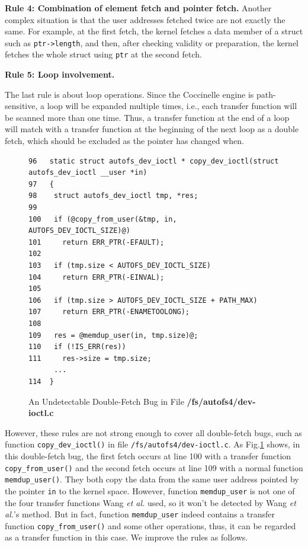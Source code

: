 \documentclass[10pt]{llncs}
\begin{document}
\textbf{Rule 4: Combination of element fetch and pointer fetch.}
Another complex situation is that the user addresses fetched twice are not exactly the same. For example, at the first fetch, the kernel fetches a data member of a struct such as \verb:ptr->length:, and then, after checking validity or preparation, the kernel fetches the whole struct using \verb:ptr: at the second fetch.

\textbf{Rule 5: Loop involvement.}

The last rule is about loop operations. Since the Coccinelle engine is path-sensitive, 
a loop will be expanded multiple times, i.e., each transfer function will be scanned 
more than one time. Thus, a transfer function at the end of a loop will match with a transfer function at the beginning of the next loop as a double fetch, which should be excluded as the pointer has changed when.





\begin{figure}[t]
  \centering
\begin{lstlisting}[style=code]
96   static struct autofs_dev_ioctl * copy_dev_ioctl(struct autofs_dev_ioctl __user *in)
97   {
98    struct autofs_dev_ioctl tmp, *res;
99   
100   if (@copy_from_user(&tmp, in, AUTOFS_DEV_IOCTL_SIZE)@)
101     return ERR_PTR(-EFAULT);
102  
103   if (tmp.size < AUTOFS_DEV_IOCTL_SIZE)
104     return ERR_PTR(-EINVAL);
105  
106   if (tmp.size > AUTOFS_DEV_IOCTL_SIZE + PATH_MAX)
107     return ERR_PTR(-ENAMETOOLONG);
108  
109   res = @memdup_user(in, tmp.size)@;
110   if (!IS_ERR(res))
111     res->size = tmp.size;
	  ...
114  }   
\end{lstlisting}
  \caption{An Undetectable Double-Fetch Bug in File \textbf{/fs/autofs4/dev-ioctl.c}}
  \label{dev-ioctl}
\end{figure}




However, these rules are not strong enough to cover all double-fetch bugs, such as function
\verb:copy_dev_ioctl(): in file \verb:/fs/autofs4/dev-ioctl.c:. As Fig.\ref{dev-ioctl} shows, 
in this double-fetch bug, the first fetch occurs at line 100 with a transfer function \verb:copy_from_user(): and the second fetch occurs at line 109 with a normal function 
\verb:memdup_user():. They both copy the data from the same user address pointed by the 
pointer \verb:in: to the kernel space. However, function \verb:memdup_user: is not one of 
the four transfer functions Wang \textit{et al.} used, so it won't be detected by Wang 
\textit{et al.}'s method. But in fact, function \verb:memdup_user: indeed contains a 
transfer function \verb:copy_from_user(): and some other operations, thus, it can be 
regarded as a transfer function in this case. We improve the rules as follows.
\end{document}
